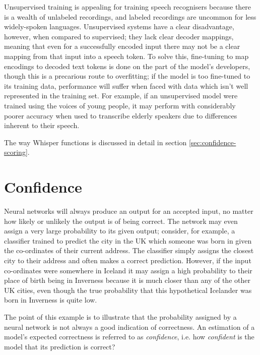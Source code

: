 Unsupervised training is appealing for training speech recognisers because there is a wealth of unlabeled recordings, and labeled recordings are uncommon for less widely-spoken languages\cite{baevski2021}.
Unsupervised systems have a clear disadvantage, however, when compared to supervised; they lack clear decoder mappings\cite{whisper}, meaning that even for a successfully encoded input there may not be a clear mapping from that input into a speech token.
To solve this, fine-tuning to map encodings to decoded text tokens is done on the part of the model's developers, though this is a precarious route to overfitting;
if the model is too fine-tuned to its training data, performance will suffer when faced with data which isn't well represented in the training set.
For example, if an unsupervised model were trained using the voices of young people, it may perform with considerably poorer accuracy when used to transcribe elderly speakers due to differences inherent to their speech\cite{Horton2010}.

The way Whisper functions is discussed in detail in section \ref{sec:confidence-scoring}.

\section{Confidence}\label{sec:litreview-confidence}
Neural networks will always produce an output for an accepted input, no matter how likely or unlikely the output is of being correct.
The network may even assign a very large probability to its given output; consider, for example, a classifier trained to predict the city in the UK which someone was born in given the co-ordinates of their current address.
The classifier simply assigns the closest city to their address and often makes a correct prediction.
However, if the input co-ordinates were somewhere in Iceland it may assign a high probability to their place of birth being in Inverness because it is much closer than any of the other UK cities, even though the true probability that this hypothetical Icelander was born in Inverness is quite low.

The point of this example is to illustrate that the probability assigned by a neural network is not always a good indication of correctness.
An estimation of a model's expected correctness is referred to as \emph{confidence}, i.e. how \emph{confident} is the model that its prediction is correct?
